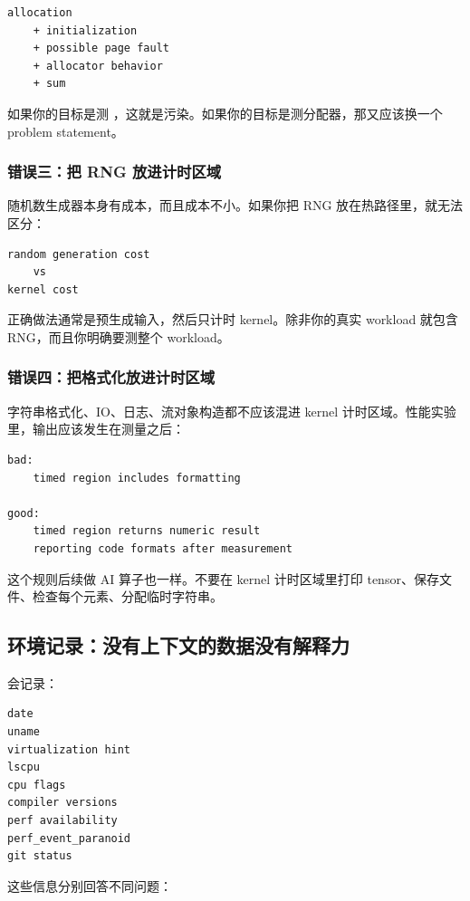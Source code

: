 \begin{lstlisting}
allocation
    + initialization
    + possible page fault
    + allocator behavior
    + sum
\end{lstlisting}

如果你的目标是测 ，这就是污染。如果你的目标是测分配器，那又应该换一个 problem statement。

\subsubsection{错误三：把 RNG 放进计时区域}

随机数生成器本身有成本，而且成本不小。如果你把 RNG 放在热路径里，就无法区分：

\begin{lstlisting}
random generation cost
    vs
kernel cost
\end{lstlisting}

正确做法通常是预生成输入，然后只计时 kernel。除非你的真实 workload 就包含 RNG，而且你明确要测整个 workload。

\subsubsection{错误四：把格式化放进计时区域}

字符串格式化、IO、日志、流对象构造都不应该混进 kernel 计时区域。性能实验里，输出应该发生在测量之后：

\begin{lstlisting}
bad:
    timed region includes formatting

good:
    timed region returns numeric result
    reporting code formats after measurement
\end{lstlisting}

这个规则后续做 AI 算子也一样。不要在 kernel 计时区域里打印 tensor、保存文件、检查每个元素、分配临时字符串。

\subsection{环境记录：没有上下文的数据没有解释力}

 会记录：

\begin{lstlisting}
date
uname
virtualization hint
lscpu
cpu flags
compiler versions
perf availability
perf_event_paranoid
git status
\end{lstlisting}

这些信息分别回答不同问题：

